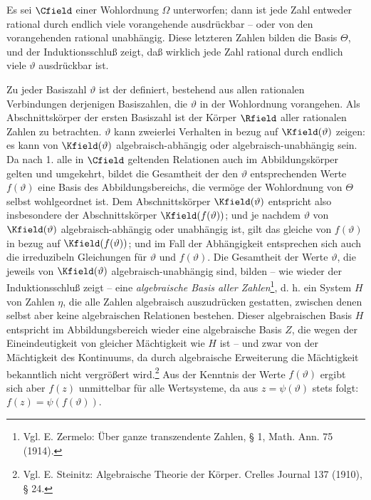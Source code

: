Es sei \(\Cfield\) einer Wohlordnung \(\Omega\) unterworfen; dann ist jede Zahl entweder rational durch endlich viele vorangehende ausdrückbar -- oder von den vorangehenden rational unabhängig. Diese letzteren Zahlen bilden die Basis \(\Theta\), und der Induktionsschluß zeigt, daß wirklich jede Zahl rational durch endlich viele \(\vartheta\) ausdrückbar ist.

Zu jeder Basiszahl \(\vartheta\) ist der  definiert, bestehend aus allen rationalen Verbindungen derjenigen Basiszahlen, die \(\vartheta\) in der Wohlordnung vorangehen. Als Abschnittskörper der ersten Basiszahl ist der Körper \(\Rfield\) aller rationalen Zahlen zu betrachten. \(\vartheta\) kann zweierlei Verhalten in bezug auf \(\Kfield(\vartheta)\) zeigen: es kann von \(\Kfield(\vartheta)\) algebraisch-abhängig oder algebraisch-unabhängig sein. Da nach 1. alle in \(\Cfield\) geltenden Relationen auch im Abbildungskörper gelten und umgekehrt, bildet die Gesamtheit der den \(\vartheta\) entsprechenden Werte \(f(\vartheta)\) eine Basis des Abbildungsbereichs, die vermöge der Wohlordnung von \(\Theta\) selbst wohlgeordnet ist. Dem Abschnittskörper \(\Kfield(\vartheta)\) entspricht also insbesondere der Abschnittskörper \(\Kfield(f(\vartheta))\); und je nachdem \(\vartheta\) von \(\Kfield(\vartheta)\) algebraisch-abhängig oder unabhängig ist, gilt das gleiche von \(f(\vartheta)\) in bezug auf \(\Kfield(f(\vartheta))\); und im Fall der Abhängigkeit entsprechen sich auch die irreduzibeln Gleichungen für \(\vartheta\) und \(f(\vartheta)\). Die Gesamtheit der Werte \(\vartheta\), die jeweils von \(\Kfield(\vartheta)\) algebraisch-unabhängig sind, bilden -- wie wieder der Induktionsschluß zeigt -- eine \emph{algebraische Basis aller Zahlen}\footnote{Vgl. E. Zermelo: Über ganze transzendente Zahlen, § 1, Math. Ann. 75 (1914).}, d. h. ein System \(H\) von Zahlen \(\eta\), die alle Zahlen algebraisch auszudrücken gestatten, zwischen denen selbst aber keine algebraischen Relationen bestehen. Dieser algebraischen Basis \(H\) entspricht im Abbildungsbereich wieder eine algebraische Basis \(Z\), die wegen der Eineindeutigkeit von gleicher Mächtigkeit wie \(H\) ist -- und zwar von der Mächtigkeit des Kontinuums, da durch algebraische Erweiterung die Mächtigkeit bekanntlich nicht vergrößert wird.\footnote{Vgl. E. Steinitz: Algebraische Theorie der Körper. Crelles Journal 137 (1910), § 24.} Aus der Kenntnis der Werte \(f(\vartheta)\) ergibt sich aber \(f(z)\) unmittelbar für alle Wertsysteme, da aus \(z=\psi(\vartheta)\) stets folgt: \(f(z)=\psi(f(\vartheta))\).

